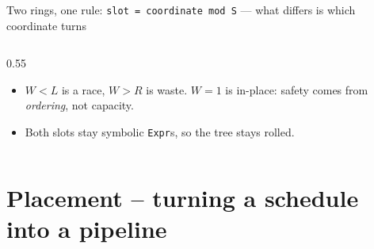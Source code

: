 \documentclass[aspectratio=169,9pt]{beamer}
\newcommand{\bad}[1]{\textcolor{warn}{\textbf{#1}}}
\begin{document}
\begin{frame}{Two rings, one rule: \texttt{slot = coordinate mod S} --- what differs is which coordinate turns}
\begin{columns}[T]
\begin{column}{0.55\textwidth}
\begin{itemize}\itemsep1pt
\item $W<L$ is a race, $W>R$ is waste. $W=1$ is in-place: safety comes from \emph{ordering}, not capacity.
\item Both slots stay symbolic \texttt{Expr}s, so the tree stays rolled.
\end{itemize}
\vspace{2pt}
\end{column}
\end{columns}
\end{frame}

\section{Placement -- turning a schedule into a pipeline}
\end{document}
